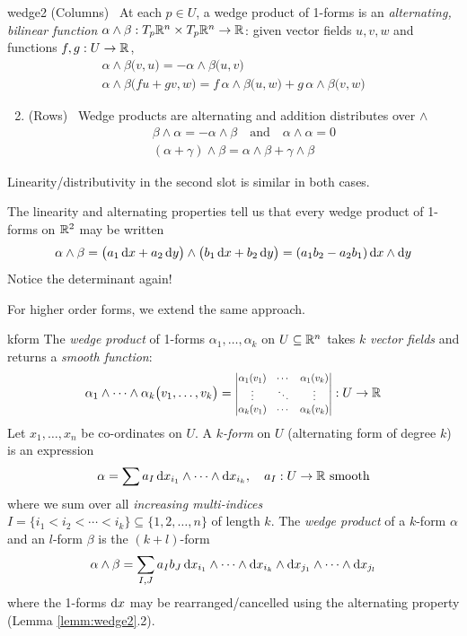 \begin{lemm}{}{wedge2}
	\exstart (Columns) \ At each $p\in U$, a wedge product of 1-forms is an \emph{alternating, bilinear function} $\alpha\wedge\beta:T_p\mathbb{R}^n\times T_p\mathbb{R}^n\to \mathbb{R}$: given vector fields $u,v,w$ and functions $f,g:U\to\mathbb{R}$,
	\begin{gather*}
		\alpha\wedge\beta\bigl(v,u\bigr)=-\alpha\wedge\beta\bigl(u,v\bigr) \tag{alternating}\\[5pt]
		\alpha\wedge\beta\bigl(fu+gv,w\bigr)=f\,\alpha\wedge\beta\bigl(u,w\bigr)+g\,\alpha\wedge\beta\bigl(v,w\bigr) \tag{linear in 1\st\ slot}
	\end{gather*}
	\begin{enumerate}\setcounter{enumi}{1}
	  \item (Rows) \ Wedge products are alternating and addition distributes over $\wedge$
	  \begin{gather*}
	  	\beta\wedge\alpha=-\alpha\wedge\beta\quad \text{and}\quad \alpha\wedge\alpha=0 \tag{alternating}\\
			(\alpha+\gamma)\wedge\beta=\alpha\wedge\beta+\gamma\wedge\beta \tag{distributivity in 1\st\ slot}
	  \end{gather*}
	\end{enumerate}
	Linearity/distributivity in the second slot is similar in both cases.
\end{lemm}

The linearity and alternating properties tell us that every wedge product of 1-forms on $\mathbb{R}^2$ may be written
\[
	\alpha\wedge\beta=\bigl(a_1\,{\mathrm{d} x}+a_2\,{\mathrm{d} y}\bigr)\wedge\bigl(b_1\,{\mathrm{d} x}+b_2\,{\mathrm{d} y}\bigr) =(a_1b_2-a_2b_1)\,{\mathrm{d} x}\wedge{\mathrm{d}y}
\]
Notice the determinant again!
\smallbreak

For higher order forms, we extend the same approach.

\begin{defn}{}{kform}
	The \emph{wedge product} of 1-forms $\alpha_1,\ldots,\alpha_k$ on $U\subseteq\mathbb{R}^n$ takes $k$ \emph{vector fields} and returns a \emph{smooth function}:\vspace{-5pt}
	\[
		\alpha_1\wedge\cdots\wedge\alpha_k\bigl(v_1,\ldots,v_k\bigr)=
		\scalebox{0.8}{$
			\begin{vmatrix}
				\alpha_1(v_1)&\cdots&\alpha_1(v_k)\\
				\vdots&\ddots&\vdots\\
				\alpha_k(v_1)&\cdots&\alpha_k(v_k)
			\end{vmatrix}
		$}:U\to\R\vspace{-5pt}
	\]
	Let $x_1,\ldots,x_n$ be co-ordinates on $U$. A \emph{$k$-form} on $U$ (alternating form of degree $k$) is an expression
	\[
		\alpha=\sum a_I\,{\mathrm{d} x}_{i_1}\wedge\cdots\wedge{\mathrm{d}x}_{i_k},\quad a_I:U\to\mathbb{R}\text{ smooth}
	\]
	where we sum over all \emph{increasing multi-indices} $I=\{i_1<i_2<\cdots< i_k\}\subseteq\{1,2,\ldots,n\}$ of length $k$.\smallbreak
	The \emph{wedge product} of a $k$-form $\alpha$ and an $l$-form $\beta$ is the $(k+l)$-form 
	\[
		\alpha\wedge \beta=\sum_{I,J}a_Ib_J\,{\mathrm{d} x}_{i_1}\wedge\cdots\wedge{\mathrm{d}x}_{i_k}\wedge{\mathrm{d}x}_{j_1}\wedge\cdots\wedge{\mathrm{d}x}_{j_l}
	\]
	where the 1-forms ${\mathrm{d} x}$ may be rearranged/cancelled using the alternating property (Lemma \ref{lemm:wedge2}.2).
\end{defn}

